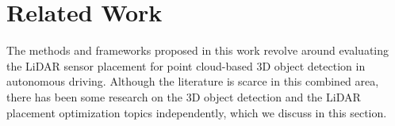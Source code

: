 \documentclass[10pt,twocolumn,letterpaper]{article}
\newcommand{\todo}[1]{\hl{[#1]}}
\begin{document}




\section{Related Work}


\label{related-work}
The methods and frameworks proposed in this work revolve around evaluating the LiDAR sensor placement for point cloud-based 3D object detection in autonomous driving. Although the literature is scarce in this combined area, there has been some research on the 3D object detection and the LiDAR placement optimization topics independently, which we discuss in this section.
\end{document}
